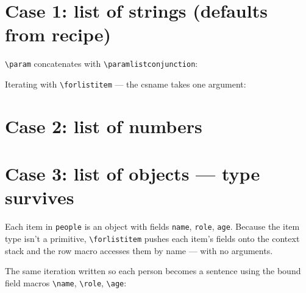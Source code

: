 \documentclass{article}
\begin{document}
    \section*{Case 1: list of strings (defaults from recipe)}

    \texttt{\textbackslash param} concatenates with \texttt{\textbackslash paramlistconjunction}:\\

    \medskip

    Iterating with \texttt{\textbackslash forlistitem} --- the csname takes one argument:

    \newcommand\itemBullet[1]{\textbullet\ #1\quad}

    \section*{Case 2: list of numbers}


    \medskip


    \section*{Case 3: list of objects --- type survives}

    Each item in \texttt{people} is an object with fields \texttt{name},
    \texttt{role}, \texttt{age}.  Because the item type isn't a primitive,
    \texttt{\textbackslash forlistitem} pushes each item's fields onto the
    context stack and the row macro accesses them by name --- with no
    arguments.

    \newcommand\peopleRow{\name{} (\role, \age) -- }

    \medskip

    The same iteration written so each person becomes a sentence using
    the bound field macros \texttt{\textbackslash name},
    \texttt{\textbackslash role}, \texttt{\textbackslash age}:

    \newcommand\peopleSentence{\name{} works as \role{} and is \age{} years old.\par}
\end{document}
